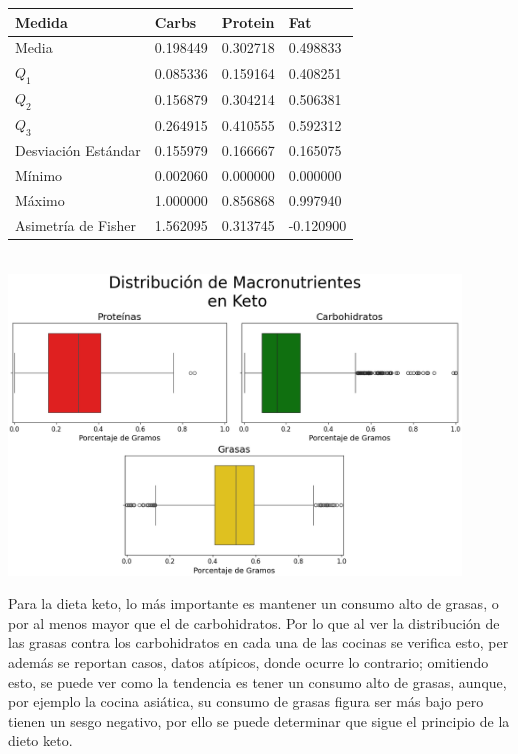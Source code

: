 \documentclass[12pt,a4paper]{article}
\begin{document}
{{            \begin{center}
                \begin{tabular}{l|lll}
                    \toprule
                        Medida & Carbs & Protein & Fat \\
                    \midrule
                        Media               & 0.198449 & 0.302718 & 0.498833 \\
                        $Q_1$               & 0.085336 & 0.159164 & 0.408251 \\
                        $Q_2$               & 0.156879 & 0.304214 & 0.506381 \\
                        $Q_3$               & 0.264915 & 0.410555 & 0.592312 \\
                        Desviación Estándar & 0.155979 & 0.166667 & 0.165075 \\
                        Mínimo              & 0.002060 & 0.000000 & 0.000000 \\
                        Máximo              & 1.000000 & 0.856868 & 0.997940 \\
                        Asimetría de Fisher & 1.562095 & 0.313745 & -0.120900 \\
                    \bottomrule
                \end{tabular}\\
                \vspace{0.5cm}
                \includegraphics[width=0.9\textwidth]{Resources/EDA/Keto_1.png}
            \end{center}

            Para la dieta keto, lo más importante es mantener un consumo alto de grasas, o 
            por al menos mayor que el de carbohidratos. Por lo que al ver la distribución de 
            las grasas contra los carbohidratos en cada una de las cocinas se verifica esto, 
            per además se reportan casos, datos atípicos, donde ocurre lo contrario; omitiendo 
            esto, se puede ver como la tendencia es tener un consumo alto de grasas, aunque, por 
            ejemplo la cocina asiática, su consumo de grasas figura ser más bajo pero tienen 
            un sesgo negativo, por ello se puede determinar que sigue el principio de la dieto keto.

}}
\end{document}

